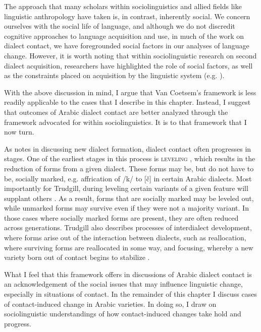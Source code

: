 \documentclass[output=paper]{langsci/langscibook}
\begin{document}
  The approach that many scholars within sociolinguistics and allied fields like linguistic anthropology have taken is, in contrast, inherently social. We concern ourselves with the social life of language, and although we do not discredit cognitive approaches to language acquisition and use, in much of the work on dialect contact, we have foregrounded social factors in our analyses of language change. However, it is worth noting that within sociolinguistic research on second dialect acquisition, researchers have highlighted the role of social factors, as well as the constraints placed on acquisition by the linguistic system (e.g. \citealt{Nycz2013,Nycz2016}).  

  With the above discussion in mind, I argue that Van Coetsem’s framework is less readily applicable to the cases that I describe in this chapter. Instead, I suggest that outcomes of Arabic dialect contact are better analyzed through the framework advocated for within sociolinguistics. It is to that framework that I now turn.  

  As \citet{Trudgill2004} notes in discussing new dialect formation, dialect contact often progresses in stages. One of the earliest stages in this process is \textsc{leveling} \citep[83]{Trudgill2004}, which results in the reduction of forms from a given dialect. These forms may be, but do not have to be, socially marked, e.g. affrication of /k/ to [č] in certain Arabic dialects. Most importantly for Trudgill, during leveling certain variants of a given feature will supplant others \citep[85]{Trudgill2004}. As a result, forms that are socially marked may be leveled out, while unmarked forms may survive even if they were not a majority variant. In those cases where socially marked forms are present, they are often reduced across generations. Trudgill also describes processes of interdialect development, where forms arise out of the interaction between dialects, such as reallocation, where surviving forms are reallocated in some way, and focusing, whereby a new variety born out of contact begins to stabilize \citep{Trudgill2004}. 

  What I feel that this framework offers in discussions of Arabic dialect contact is an acknowledgement of the social issues that may influence linguistic change, especially in situations of contact. In the remainder of this chapter I discuss cases of contact-induced change in Arabic varieties. In doing so, I draw on sociolinguistic understandings of how contact-induced changes take hold and progress. 
\end{document}
